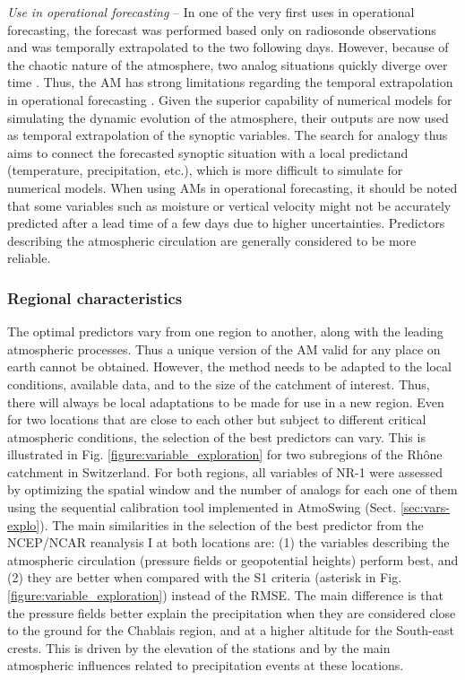 \documentclass[review]{elsarticle}
\begin{document}
\textit{Use in operational forecasting} -- In one of the very first uses in operational forecasting, the forecast was performed based only on radiosonde observations and was temporally extrapolated to the two following days. However, because of the chaotic nature of the atmosphere, two analog situations quickly diverge over time \citep{Lorenz1969}. Thus, the AM has strong limitations regarding the temporal extrapolation in operational forecasting \citep{Bontron2004}. Given the superior capability of numerical models for simulating the dynamic evolution of the atmosphere, their outputs are now used as temporal extrapolation of the synoptic variables. The search for analogy thus aims to connect the forecasted synoptic situation with a local predictand (temperature, precipitation, etc.), which is more difficult to simulate for numerical models. When using AMs in operational forecasting, it should be noted that some variables such as moisture or vertical velocity might not be accurately predicted after a lead time of a few days due to higher uncertainties. Predictors describing the atmospheric circulation are generally considered to be more reliable.


\subsubsection{Regional characteristics}

The optimal predictors vary from one region to another, along with the leading atmospheric processes. Thus a unique version of the AM valid for any place on earth cannot be obtained. However, the method needs to be adapted to the local conditions, available data, and to the size of the catchment of interest. Thus, there will always be local adaptations to be made for use in a new region. Even for two locations that are close to each other but subject to different critical atmospheric conditions, the selection of the best predictors can vary. This is illustrated in Fig. \ref{figure:variable_exploration} for two subregions of the Rh\^{o}ne catchment in Switzerland. For both regions, all variables of NR-1 were assessed by optimizing the spatial window and the number of analogs for each one of them using the sequential calibration tool implemented in AtmoSwing (Sect. \ref{sec:vars-explo}). The main similarities in the selection of the best predictor from the NCEP/NCAR reanalysis I at both locations are: (1) the variables describing the atmospheric circulation (pressure fields or geopotential heights) perform best, and (2) they are better when compared with the S1 criteria (asterisk in Fig. \ref{figure:variable_exploration}) instead of the RMSE. The main difference is that the pressure fields better explain the precipitation when they are considered close to the ground for the Chablais region, and at a higher altitude for the South-east crests. This is driven by the elevation of the stations and by the main atmospheric influences related to precipitation events at these locations. 
\end{document}
